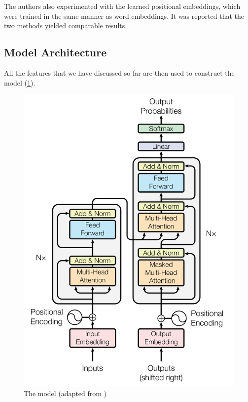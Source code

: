The authors also experimented with the learned positional embeddings, which were trained in the same manner as word embeddings. It was reported that the two methods yielded comparable results.

\subsection{Model Architecture}
\label{lit-trans-arch}

All the features that we have discussed so far are then used to construct the \transformer model (\cref{fig:transformer}).

\begin{figure}[t]
    \centering
    \includegraphics[width=0.9\linewidth]{img/transformer.png}
    \caption{The \transformer model (adapted from \cite{DBLP:conf/nips/VaswaniSPUJGKP17})}
    \label{fig:transformer}
\end{figure}

